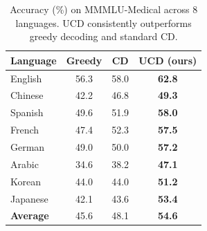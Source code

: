 \begin{table}[t]
\centering
\small
\begin{tabular}{lccc}
\toprule
Language & Greedy & CD & UCD (ours) \\
\midrule
English & 56.3 & 58.0 & \textbf{62.8} \\
Chinese & 42.2 & 46.8 & \textbf{49.3} \\
Spanish & 49.6 & 51.9 & \textbf{58.0} \\
French & 47.4 & 52.3 & \textbf{57.5} \\
German & 49.0 & 50.0 & \textbf{57.2} \\
Arabic & 34.6 & 38.2 & \textbf{47.1} \\
Korean & 44.0 & 44.0 & \textbf{51.2} \\
Japanese & 42.1 & 43.6 & \textbf{53.4} \\
\midrule
\textbf{Average} & 45.6 & 48.1 & \textbf{54.6} \\
\bottomrule
\end{tabular}
\caption{Accuracy (\%) on MMMLU-Medical across 8 languages. UCD consistently outperforms greedy decoding and standard CD.}
\label{tab:mmmlu_medical_main}
\end{table}